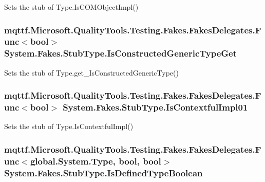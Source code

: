 Sets the stub of Type.\-Is\-C\-O\-M\-Object\-Impl()

\hypertarget{class_system_1_1_fakes_1_1_stub_type_ac0de01dd135e6d2cba6b581e098e1a60}{
\subsubsection[{Is\-Constructed\-Generic\-Type\-Get}]{\setlength{\rightskip}{0pt plus 5cm}mqttf.\-Microsoft.\-Quality\-Tools.\-Testing.\-Fakes.\-Fakes\-Delegates.\-Func$<$bool$>$ System.\-Fakes.\-Stub\-Type.\-Is\-Constructed\-Generic\-Type\-Get}}\label{class_system_1_1_fakes_1_1_stub_type_ac0de01dd135e6d2cba6b581e098e1a60}


Sets the stub of Type.\-get\-\_\-\-Is\-Constructed\-Generic\-Type()

\hypertarget{class_system_1_1_fakes_1_1_stub_type_aca44e770ef4e6e4d58d62602aaa12551}{
\subsubsection[{Is\-Contextful\-Impl01}]{\setlength{\rightskip}{0pt plus 5cm}mqttf.\-Microsoft.\-Quality\-Tools.\-Testing.\-Fakes.\-Fakes\-Delegates.\-Func$<$bool$>$ System.\-Fakes.\-Stub\-Type.\-Is\-Contextful\-Impl01}}\label{class_system_1_1_fakes_1_1_stub_type_aca44e770ef4e6e4d58d62602aaa12551}


Sets the stub of Type.\-Is\-Contextful\-Impl()

\hypertarget{class_system_1_1_fakes_1_1_stub_type_a13e8a57704f673b59d740251ab0176cc}{
\subsubsection[{Is\-Defined\-Type\-Boolean}]{\setlength{\rightskip}{0pt plus 5cm}mqttf.\-Microsoft.\-Quality\-Tools.\-Testing.\-Fakes.\-Fakes\-Delegates.\-Func$<$global.\-System.\-Type, bool, bool$>$ System.\-Fakes.\-Stub\-Type.\-Is\-Defined\-Type\-Boolean}}\label{class_system_1_1_fakes_1_1_stub_type_a13e8a57704f673b59d740251ab0176cc}


